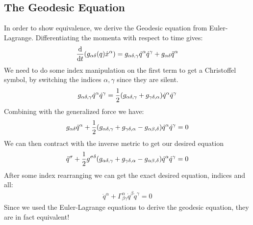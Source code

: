\documentclass[12pt]{article}
\begin{document}
\subsection{The Geodesic Equation}
In order to show equivalence, we derive the Geodesic equation from Euler-Lagrange. Differentiating the momenta with respect to time gives:
\begin{align*}
  \dv{t}\qty(g_{\alpha\delta}(q)\dot{x}^\alpha)=g_{\alpha\delta,\gamma}
  \dot{q}^\alpha\dot{q}^{\gamma}+g_{\alpha\delta}\ddot{q}^\alpha
\end{align*}
We need to do some index manipulation on the first term to get a Christoffel symbol, by switching the indices $\alpha,\gamma$ since they are silent.
\begin{align*}
  g_{\alpha\delta,\gamma}\dot{q}^\alpha\dot{q}^{\gamma}=
  \frac12\qty(g_{\alpha\delta,\gamma}+g_{\gamma\delta,\alpha})
  \dot{q}^\alpha\dot{q}^\gamma
\end{align*}
Combining with the generalized force we have:
\begin{align*}
  g_{\alpha\delta}\ddot{q}^\alpha+
  \frac12\qty(g_{\alpha\delta,\gamma}+g_{\gamma\delta,\alpha}
  -g_{\alpha\beta,\delta})\dot{q}^\alpha\dot{q}^\gamma=0
\end{align*}
We can then contract with the inverse metric to get our desired equation
\begin{align*}
  \ddot{q}^\sigma+\frac12g^{\sigma\delta}
  \qty(g_{\alpha\delta,\gamma}+g_{\gamma\delta,\alpha}
  -g_{\alpha\beta,\delta})\dot{q}^\alpha\dot{q}^\gamma=0
\end{align*}
After some index rearranging we can get the exact desired equation, indices and all:
\begin{align}
  \boxed{
    \ddot{q}^\alpha+\Gamma^{\alpha}_{\beta\gamma}\dot{q}^\beta\dot{q}^\gamma=0
  }
\end{align}
Since we used the Euler-Lagrange equations to derive the geodesic equation, they are in fact equivalent!
\end{document}
